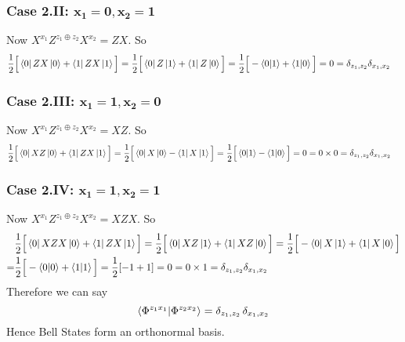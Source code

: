 \documentclass[a4paper, 11pt]{article}
\begin{document}
{\subsubsection*{Case 2.II: $\boldsymbol{x_1=0,x_2=1}$}
Now $X^{x_1}Z^{z_1\oplus z_2}X^{x_2}=ZX$. 
So \begin{align*}
	&\frac12 \Big[\bra{0}ZX\ket{0}+\bra{1}ZX\ket{1}\Big] =\frac12 \Big[\bra{0}Z\ket{1}+\bra{1}Z\ket{0}\Big]=\frac12 \Big[-\bra{0}\ket{1}+\bra{1}\ket{0}\Big]	= 0=\delta_{z_1,z_2}\delta_{x_1,x_2}
\end{align*}
\subsubsection*{Case 2.III: $\boldsymbol{x_1=1,x_2=0}$}
Now $X^{x_1}Z^{z_1\oplus z_2}X^{x_2}=XZ$. 
So \begin{align*}
	&\frac12 \Big[\bra{0}XZ\ket{0}+\bra{1}ZX\ket{1}\Big] =\frac12 \Big[\bra{0}X\ket{0}-\bra{1}X\ket{1}\Big]=\frac12 \Big[\bra{0}\ket{1}-\bra{1}\ket{0}\Big]	= 0 = 0\times 0=\delta_{z_1,z_2}\delta_{x_1,x_2}
\end{align*}
\subsubsection*{Case 2.IV: $\boldsymbol{x_1=1,x_2=1}$}
Now $X^{x_1}Z^{z_1\oplus z_2}X^{x_2}=XZX$. 
So \begin{align*}
	&\frac12 \Big[\bra{0}XZX\ket{0}+\bra{1}ZX\ket{1}\Big]=\frac12 \Big[\bra{0}XZ\ket{1}+\bra{1}XZ\ket{0}\Big]= \frac12 \Big[-\bra{0}X\ket{1}+\bra{1}X\ket{0}\Big]\\
	=& \frac12 \Big[-\bra{0}\ket{0}+\bra{1}\ket{1}\Big]	=  \frac12[-1+1]= 0 = 0\times 1 =\delta_{z_1,z_2}\delta_{x_1,x_2}
\end{align*}Therefore we can say $$\bra{\Phi^{z_1x_1}}\ket{\Phi^{z_2x_2}}=\delta_{z_1,z_2}\,\delta_{x_1,x_2}$$Hence Bell States form an orthonormal basis.

}

\end{document}
